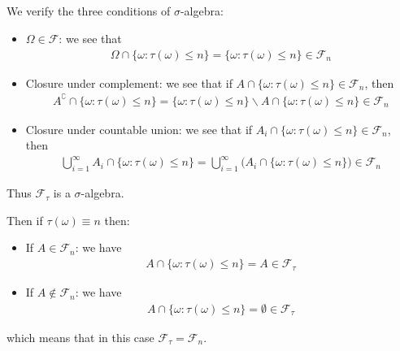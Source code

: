 \documentclass[11pt,a4paper]{ctexart}
\numberwithin{equation}{section}%
\newcommand{\F}{\mathcal{F}}
\begin{document}
\subsection{}

We verify the three conditions of $ \sigma  $-algebra:
\begin{itemize}[topsep=2pt,itemsep=0pt]
    \item $ \Omega \in \F $: we see that
    \begin{align*}
        \Omega \cap \{\omega : \tau(\omega )\leq n\} = \{\omega : \tau(\omega )\leq n\} \in \F_n
    \end{align*}
    \item Closure under complement: we see that if $ A \cap \{\omega : \tau(\omega )\leq n\} \in \F_n $, then
    \begin{align*}
        A^\complement \cap \{\omega : \tau(\omega )\leq n\} = \{\omega : \tau(\omega )\leq n\}\backslash A \cap \{\omega : \tau(\omega )\leq n\} \in \F_{n}
    \end{align*}
    \item Closure under countable union: we see that if $ A_i \cap \{\omega : \tau(\omega )\leq n\} \in \F_n $, then
    \begin{align*}
        \bigcup_{i=1}^\infty A_i \cap \{\omega : \tau(\omega )\leq n\} = \bigcup_{i=1}^\infty \big( A_i \cap \{\omega : \tau(\omega )\leq n\} \big) \in \F_n
    \end{align*}
\end{itemize}

Thus $ \F_\tau $ is a $ \sigma  $-algebra.

Then if $ \tau(\omega )\equiv n $ then:
\begin{itemize}[topsep=2pt,itemsep=0pt]
    \item If $ A\in \F_n$: we have
    \begin{align*}
        A\cap \{\omega : \tau(\omega )\leq n\} = A \in \F_\tau 
    \end{align*}
    \item If $ A\not\in \F_n$: we have
    \begin{align*}
        A\cap \{\omega : \tau(\omega )\leq n\} = \emptyset \in \F_\tau  
    \end{align*}
\end{itemize}
which means that in this case $ \F_\tau =\F_n $.

\subsection{}
\end{document}
